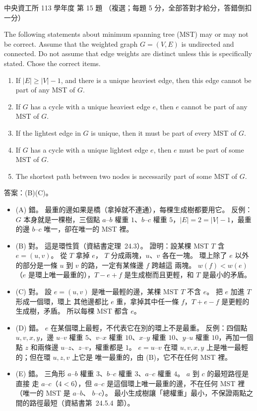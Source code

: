 \begin{pastexam}[label={px:ncu-113-dsa-15}]{中央資工所 113 學年度 第 15 題}
（複選；每題 5 分，全部答對才給分，答錯倒扣一分）

The following statements about minimum spanning tree (MST) may or may not be correct. Assume that the weighted
graph $G=(V,E)$ is undirected and connected. Do not assume that edge weights are distinct unless this is
specifically stated. Chose the correct items.
\begin{enumerate}[label=(\Alph*)]
\item If $|E|\ge|V|-1$, and there is a unique heaviest edge, then this edge cannot be part of any MST of $G$.
\item If $G$ has a cycle with a unique heaviest edge $e$, then $e$ cannot be part of any MST of $G$.
\item If the lightest edge in $G$ is unique, then it must be part of every MST of $G$.
\item If $G$ has a cycle with a unique lightest edge $e$, then $e$ must be part of some MST of $G$.
\item The shortest path between two nodes is necessarily part of some MST of $G$.
\end{enumerate}
\end{pastexam}

\begin{pastsoln}
答案：(B)(C)。

\begin{itemize}
\item (A) 錯。 最重的邊如果是橋（拿掉就不連通），每棵生成樹都要用它。 反例：$G$ 本身就是一棵樹，三個點
$a$--$b$ 權重 $1$、$b$--$c$ 權重 $5$，$|E| = 2 = |V| - 1$，最重的邊 $b$--$c$ 唯一，卻在唯一的 MST 裡。
\item (B) 對。 這是環性質（資結書定理~24.3）。 證明：設某棵 MST $T$ 含 $e = (u, v)$。 從 $T$ 拿掉 $e$，
$T$ 分成兩塊，$u$、$v$ 各在一塊。 環上除了 $e$ 以外的部分是一條 $u$ 到 $v$ 的路，一定有某條邊 $f$ 跨越這
兩塊。 $w(f) < w(e)$（$e$ 是環上唯一最重的），$T - e + f$ 是生成樹而且更輕，和 $T$ 是最小的矛盾。
\item (C) 對。 設 $e = (u, v)$ 是唯一最輕的邊，某棵 MST $T$ 不含 $e$。 把 $e$ 加進 $T$ 形成一個環，環上
其他邊都比 $e$ 重，拿掉其中任一條 $f$，$T + e - f$ 是更輕的生成樹，矛盾。 所以每棵 MST 都含 $e$。
\item (D) 錯。 $e$ 在某個環上最輕，不代表它在別的環上不是最重。 反例：四個點 $u, v, x, y$，邊
$u$--$v$ 權重 $5$、$v$--$x$ 權重 $10$、$x$--$y$ 權重 $10$、$y$--$u$ 權重 $10$，再加一個點 $z$ 和兩條邊
$u$--$z$、$z$--$v$，權重都是 $1$。 $e = u$--$v$ 在環 $u, v, x, y$ 上是唯一最輕的；但在環 $u, z, v$ 上它是
唯一最重的，由 (B)，它不在任何 MST 裡。
\item (E) 錯。 三角形 $a$--$b$ 權重 $3$、$b$--$c$ 權重 $3$、$a$--$c$ 權重 $4$。 $a$ 到 $c$ 的最短路徑是直接
走 $a$--$c$（$4 < 6$），但 $a$--$c$ 是這個環上唯一最重的邊，不在任何 MST 裡（唯一的 MST 是 $a$--$b$、
$b$--$c$）。 最小生成樹讓「總權重」最小，不保證兩點之間的路徑最短（資結書第~24.5.4~節）。
\end{itemize}
\end{pastsoln}
